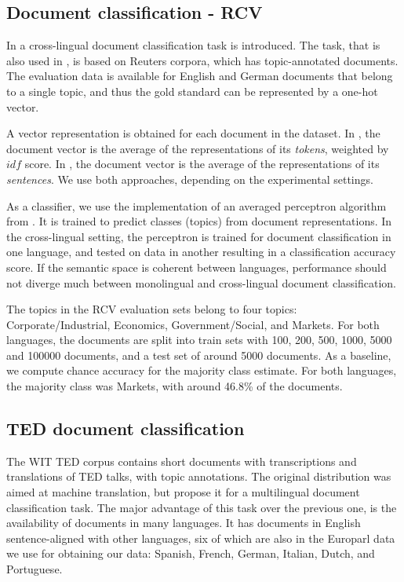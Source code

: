 \subsection{Document classification - RCV}
In \cite{klementiev2012inducing} a cross-lingual document classification task is introduced. The task, that is also used in \cite{hermann2013multilingual}, is based on Reuters corpora, which has topic-annotated documents. The evaluation data is available for English and German documents that belong to a single topic, and thus the gold standard can be represented by a one-hot vector.

A vector representation is obtained for each document in the dataset. In \cite{klementiev2012inducing}, the document vector is the average of the representations of its \emph{tokens}, weighted by $idf$ score. In \cite{hermann2013multilingual}, the document vector is the average of the representations of its \emph{sentences}. We use both approaches, depending on the experimental settings.

As a classifier, we use the implementation of an averaged perceptron algorithm from \cite{klementiev2012inducing}. It is trained to predict classes (topics) from document representations. In the cross-lingual setting, the perceptron is trained for document classification in one language, and tested on data in another resulting in a classification accuracy score. If the semantic space is coherent between languages, performance should not diverge much between monolingual and cross-lingual document classification. 

The topics in the RCV evaluation sets belong to four topics: Corporate/Industrial, Economics, Government/Social, and Markets.
For both languages, the documents are split into train sets with 100, 200, 500, 1000, 5000 and 100000 documents, and a test set of around 5000 documents.
As a baseline, we compute chance accuracy for the majority class estimate. For both languages, the majority class was Markets, with around 46.8\% of the documents.

\subsection{TED document classification}
The WIT TED corpus \cite{cettolo2012} contains short documents with transcriptions and translations of TED talks, with topic annotations. The original distribution was aimed at machine translation, but \cite{hermann2014multilingual} propose it for a multilingual document classification task. The major advantage of this task over the previous one, is the availability of documents in many languages. It has documents in English sentence-aligned with other languages, six of which are also in the Europarl data we use for obtaining our data: Spanish, French, German, Italian, Dutch, and Portuguese.


